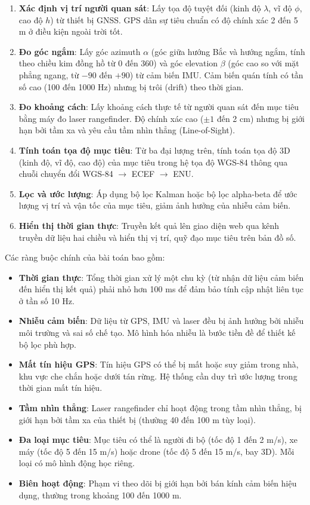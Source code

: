 \begin{enumerate}
    \item \textbf{Xác định vị trí người quan sát}: Lấy tọa độ tuyệt đối (kinh độ $\lambda$, vĩ độ $\phi$, cao độ $h$) từ thiết bị GNSS. GPS dân sự tiêu chuẩn có độ chính xác 2 đến 5 m ở điều kiện ngoài trời tốt.
    \item \textbf{Đo góc ngắm}: Lấy góc azimuth $\alpha$ (góc giữa hướng Bắc và hướng ngắm, tính theo chiều kim đồng hồ từ 0\textdegree{} đến 360\textdegree{}) và góc elevation $\beta$ (góc cao so với mặt phẳng ngang, từ $-90$\textdegree{} đến $+90$\textdegree{}) từ cảm biến IMU. Cảm biến quán tính có tần số cao (100 đến 1000 Hz) nhưng bị trôi (drift) theo thời gian.
    \item \textbf{Đo khoảng cách}: Lấy khoảng cách thực tế từ người quan sát đến mục tiêu bằng máy đo laser rangefinder. Độ chính xác cao ($\pm 1$ đến 2 cm) nhưng bị giới hạn bởi tầm xa và yêu cầu tầm nhìn thẳng (Line-of-Sight).
    \item \textbf{Tính toán tọa độ mục tiêu}: Từ ba đại lượng trên, tính toán tọa độ 3D (kinh độ, vĩ độ, cao độ) của mục tiêu trong hệ tọa độ WGS-84 thông qua chuỗi chuyển đổi WGS-84 $\rightarrow$ ECEF $\rightarrow$ ENU.
    \item \textbf{Lọc và ước lượng}: Áp dụng bộ lọc Kalman hoặc bộ lọc alpha-beta để ước lượng vị trí và vận tốc của mục tiêu, giảm ảnh hưởng của nhiễu cảm biến.
    \item \textbf{Hiển thị thời gian thực}: Truyền kết quả lên giao diện web qua kênh truyền dữ liệu hai chiều và hiển thị vị trí, quỹ đạo mục tiêu trên bản đồ số.
\end{enumerate}

Các ràng buộc chính của bài toán bao gồm:

\begin{itemize}
    \item \textbf{Thời gian thực}: Tổng thời gian xử lý một chu kỳ (từ nhận dữ liệu cảm biến đến hiển thị kết quả) phải nhỏ hơn 100 ms để đảm bảo tính cập nhật liên tục ở tần số 10 Hz.
    \item \textbf{Nhiễu cảm biến}: Dữ liệu từ GPS, IMU và laser đều bị ảnh hưởng bởi nhiễu môi trường và sai số chế tạo. Mô hình hóa nhiễu là bước tiền đề để thiết kế bộ lọc phù hợp.
    \item \textbf{Mất tín hiệu GPS}: Tín hiệu GPS có thể bị mất hoặc suy giảm trong nhà, khu vực che chắn hoặc dưới tán rừng. Hệ thống cần duy trì ước lượng trong thời gian mất tín hiệu.
    \item \textbf{Tầm nhìn thẳng}: Laser rangefinder chỉ hoạt động trong tầm nhìn thẳng, bị giới hạn bởi tầm xa của thiết bị (thường 40 đến 100 m tùy loại).
    \item \textbf{Đa loại mục tiêu}: Mục tiêu có thể là người đi bộ (tốc độ 1 đến 2 m/s), xe máy (tốc độ 5 đến 15 m/s) hoặc drone (tốc độ 5 đến 15 m/s, bay 3D). Mỗi loại có mô hình động học riêng.
    \item \textbf{Biên hoạt động}: Phạm vi theo dõi bị giới hạn bởi bán kính cảm biến hiệu dụng, thường trong khoảng 100 đến 1000 m.
\end{itemize}

